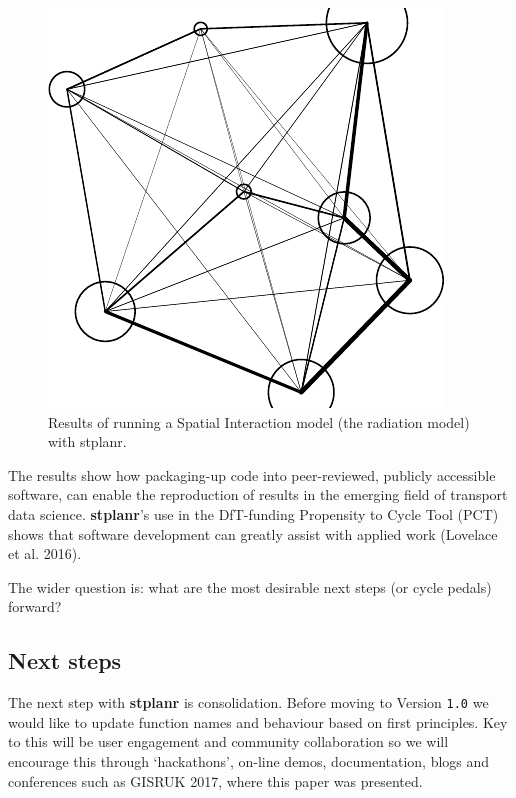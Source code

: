\documentclass[11pt]{article}
\begin{document}
\begin{figure}
\includegraphics[width=\textwidth]{stplanr-paper_files/figure-latex/unnamed-chunk-8-2} \caption{Results of running a Spatial Interaction model (the radiation model) with stplanr.}\label{fig:unnamed-chunk-82}
\end{figure}

The results show how packaging-up code into peer-reviewed, publicly
accessible software, can enable the reproduction of results in the
emerging field of transport data science. \textbf{stplanr}'s use in the
DfT-funding Propensity to Cycle Tool (PCT) shows that software
development can greatly assist with applied work (Lovelace et al. 2016).

The wider question is: what are the most desirable next steps (or cycle
pedals) forward?

\subsection{Next steps}\label{next-steps}

The next step with \textbf{stplanr} is consolidation. Before moving to
Version \texttt{1.0} we would like to update function names and
behaviour based on first principles. Key to this will be user engagement
and community collaboration so we will encourage this through
`hackathons', on-line demos, documentation, blogs and conferences such
as GISRUK 2017, where this paper was presented.
\end{document}
